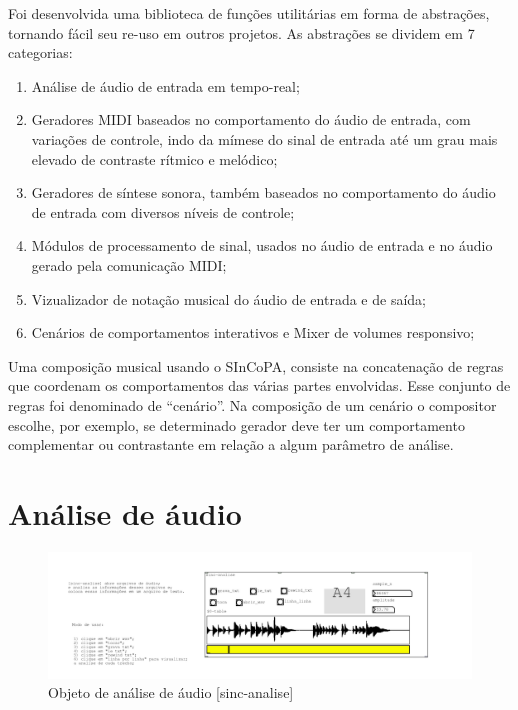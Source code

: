 \documentclass{ppgmus}
\begin{document}
  Foi desenvolvida uma biblioteca de funções utilitárias em forma de abstrações, 
tornando fácil seu re-uso em outros projetos. As abstrações se dividem em 7 categorias:

\begin{enumerate}
 \item Análise de áudio de entrada em tempo-real;
 \item Geradores MIDI baseados no comportamento do áudio de 
entrada, com variações de controle, indo da mímese do sinal de entrada
até um grau mais elevado de contraste rítmico e melódico;
 \item Geradores de síntese sonora, também baseados no comportamento
do áudio de entrada com diversos níveis de controle;
 \item Módulos de processamento de sinal, usados no áudio de entrada e no
áudio gerado pela comunicação MIDI;
 \item Vizualizador de notação musical do áudio de entrada e de saída;
 \item Cenários de comportamentos interativos e Mixer de volumes responsivo;
 
\end{enumerate}


Uma composição musical usando o SInCoPA, consiste na concatenação de
regras que coordenam os comportamentos das várias partes envolvidas.
Esse conjunto de regras foi denominado de ``cenário''. Na composição
de um cenário o compositor escolhe, por exemplo,  se determinado gerador 
deve ter um comportamento complementar ou contrastante  em relação a algum
parâmetro de análise.









\section{Análise de áudio}

\begin{figure}[!htt]
\includegraphics[scale=.7]{sinc-analise}
\caption{Objeto de análise de áudio [sinc-analise]}
\label{sinc-analise}
\end{figure}
\end{document}

